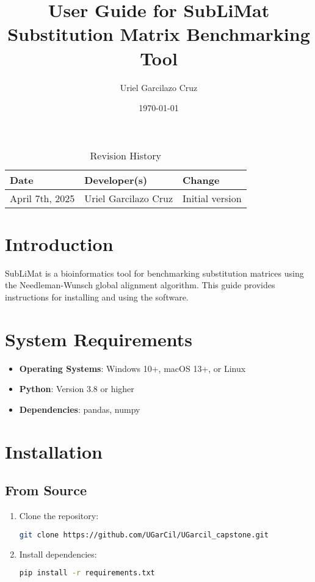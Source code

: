 \documentclass{article}
\title{User Guide for SubLiMat\\Substitution Matrix Benchmarking Tool}
\author{Uriel Garcilazo Cruz}
\date{\today}
\begin{document}
\begin{table}[hp]
\caption{Revision History} \label{TblRevisionHistory}
\begin{tabularx}{\textwidth}{llX}
\toprule
\textbf{Date} & \textbf{Developer(s)} & \textbf{Change}\\
\midrule
April 7th, 2025 & Uriel Garcilazo Cruz & Initial version\\
\bottomrule
\end{tabularx}
\end{table}

\maketitle

\section{Introduction}
SubLiMat is a bioinformatics tool for benchmarking substitution matrices using the Needleman-Wunsch global alignment algorithm. This guide provides instructions for installing and using the software.

\section{System Requirements}
\begin{itemize}
\item \textbf{Operating Systems}: Windows 10+, macOS 13+, or Linux
\item \textbf{Python}: Version 3.8 or higher
\item \textbf{Dependencies}: pandas, numpy
\end{itemize}

\section{Installation}
\subsection{From Source}
\begin{enumerate}
\item Clone the repository:
\begin{lstlisting}[language=bash]
git clone https://github.com/UGarCil/UGarcil_capstone.git
\end{lstlisting}

\item Install dependencies:
\begin{lstlisting}[language=bash]
pip install -r requirements.txt
\end{lstlisting}
\end{enumerate}
\end{document}
